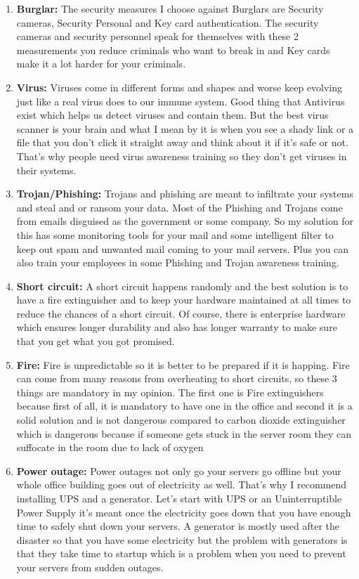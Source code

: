 \documentclass[12pt, letterpaper]{article}
\begin{document}
\begin{enumerate}
    \item \textbf{Burglar:} The security measures I choose against Burglars are Security cameras, Security Personal and Key card authentication. The security cameras and security personnel speak for themselves with these 2 measurements you reduce criminals who want to break in and Key cards make it a lot harder for your criminals.
    \item \textbf{Virus:} Viruses come in different forms and shapes and worse keep evolving just like a real virus does to our immune system. Good thing that Antivirus exist which helps us detect viruses and contain them. But the best virus scanner is your brain and what I mean by it is when you see a shady link or a file that you don't click it straight away and think about it if it's safe or not. That's why people need virus awareness training so they don't get viruses in their systems.
    \item \textbf{Trojan/Phishing:} Trojans and phishing are meant to infiltrate your systems and steal and or ransom your data. Most of the Phishing and Trojans come from emails disguised as the government or some company. So my solution for this has some monitoring tools for your mail and some intelligent filter to keep out spam and unwanted mail coming to your mail servers. Plus you can also train your employees in some Phishing and Trojan awareness training.
    \item \textbf{Short circuit:} A short circuit happens randomly and the best solution is to have a fire extinguisher and to keep your hardware maintained at all times to reduce the chances of a short circuit. Of course, there is enterprise hardware which ensures longer durability and also has longer warranty to make sure that you get what you got promised.
    \item \textbf{Fire:} Fire is unpredictable so it is better to be prepared if it is happing. Fire can come from many reasons from overheating to short circuits, so these 3 things are mandatory in my opinion. The first one is Fire extinguishers because first of all, it is mandatory to have one in the office and second it is a solid solution and is not dangerous compared to carbon dioxide extinguisher which is dangerous because if someone gets stuck in the server room they can suffocate in the room due to lack of oxygen
    \item \textbf{Power outage:} Power outages not only go your servers go offline but your whole office building goes out of electricity as well. That's why I recommend installing UPS and a generator. Let's start with UPS or an Uninterruptible Power Supply it's meant once the electricity goes down that you have enough time to safely shut down your servers. A generator is mostly used after the disaster so that you have some electricity but the problem with generators is that they take time to startup which is a problem when you need to prevent your servers from sudden outages.
\end{enumerate}
\end{document}
